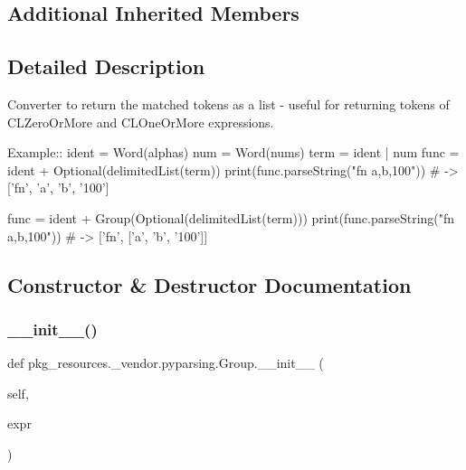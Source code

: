 \subsection*{Additional Inherited Members}


\subsection{Detailed Description}
\begin{DoxyVerb}Converter to return the matched tokens as a list - useful for returning tokens of C{L{ZeroOrMore}} and C{L{OneOrMore}} expressions.

Example::
    ident = Word(alphas)
    num = Word(nums)
    term = ident | num
    func = ident + Optional(delimitedList(term))
    print(func.parseString("fn a,b,100"))  # -> ['fn', 'a', 'b', '100']

    func = ident + Group(Optional(delimitedList(term)))
    print(func.parseString("fn a,b,100"))  # -> ['fn', ['a', 'b', '100']]
\end{DoxyVerb}
 

\subsection{Constructor \& Destructor Documentation}
\mbox{\label{classpkg__resources_1_1__vendor_1_1pyparsing_1_1Group_a4027ca22a29af1111ae2c7c0194bb330}} 
\subsubsection{\texorpdfstring{\+\_\+\+\_\+init\+\_\+\+\_\+()}{\_\_init\_\_()}}
{\footnotesize\ttfamily def pkg\+\_\+resources.\+\_\+vendor.\+pyparsing.\+Group.\+\_\+\+\_\+init\+\_\+\+\_\+ (\begin{DoxyParamCaption}\item[{}]{self,  }\item[{}]{expr }\end{DoxyParamCaption})}



